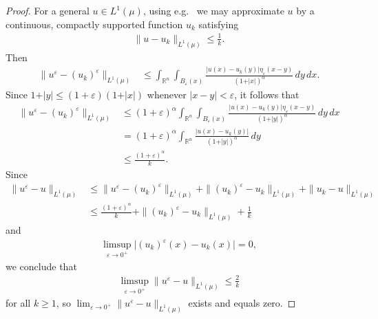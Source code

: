 \documentclass[a4paper,12pt,reqno]{amsart}
\numberwithin{equation}{section}
\theoremstyle{definition}
\theoremstyle{notation}
\newcommand{\R}{\mathds{R}}
\begin{document}
\begin{proof}
For a general \(u\in L^1(\mu)\), using e.g.~\cite[Theorem~3.14]{MR924157}
we may approximate \(u\) by a continuous, compactly supported function \(u_k\) satisfying \begin{align*}
    \| u- u_k \|_{L^1(\mu)} \leq \frac 1 k .
\end{align*} Then \begin{align*}
     \| u^\varepsilon- (u_k)^\varepsilon \|_{L^1(\mu)}&\leq \int_{\R^n} \int_{B_\varepsilon(x)} \frac{\vert u(x)-u_k(y)\vert \eta_\varepsilon(x-y) }{(1+\vert x \vert)^\alpha} \, dy \, dx .
\end{align*} Since \(1+\vert y \vert \leq (1+\varepsilon) (1+\vert x \vert) \) whenever \(\vert x-y\vert <\varepsilon\), it follows that \begin{align*}
    \| u^\varepsilon- (u_k)^\varepsilon \|_{L^1(\mu)}&\leq (1+\varepsilon)^\alpha \int_{\R^n} \int_{B_\varepsilon(x)} \frac{\vert u(x)-u_k(y)\vert \eta_\varepsilon(x-y) }{(1+\vert y \vert)^\alpha} \, dy \, dx \\
    &= (1+\varepsilon)^\alpha \int_{\R^n} \frac{\vert u(x)-u_k(y)\vert  }{(1+\vert y \vert)^\alpha} \, dy \\
    &\leq \frac{(1+\varepsilon)^\alpha } k . 
\end{align*} Since \begin{align*}
    \| u^\varepsilon - u \|_{L^1(\mu)} &\leq \| u^\varepsilon - (u_k)^\varepsilon \|_{L^1(\mu)}+\| (u_k)^\varepsilon - u_k \|_{L^1(\mu)}+\| u_k - u \|_{L^1(\mu)}\\ &\leq \frac{(1+\varepsilon)^\alpha } k  + \| (u_k)^\varepsilon - u_k \|_{L^1(\mu)}+\frac 1 k 
\end{align*} and \begin{align*}
    \limsup_{\varepsilon \to 0^+ } \vert (u_k)^\varepsilon(x) - u_k(x)\vert = 0,  
\end{align*}we conclude that \begin{align*}
     \limsup_{\varepsilon \to 0^+ } \| u^\varepsilon - u \|_{L^1(\mu)} \leq \frac 2 k 
\end{align*} for all \(k\geq 1\), so \(\displaystyle\lim_{\varepsilon \to 0^+ } \| u^\varepsilon - u \|_{L^1(\mu)}\) exists and equals zero.
\end{proof}
\end{document}
